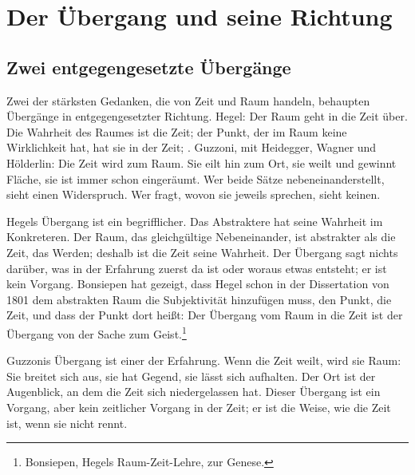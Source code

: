\chapter{Der Übergang und seine Richtung}

\section{Zwei entgegengesetzte Übergänge}

Zwei der stärksten Gedanken, die von Zeit und Raum handeln, behaupten Übergänge in entgegengesetzter Richtung. Hegel: Der Raum geht in die Zeit über. Die Wahrheit des Raumes ist die Zeit; der Punkt, der im Raum keine Wirklichkeit hat, hat sie in der Zeit; . Guzzoni, mit Heidegger, Wagner und Hölderlin: Die Zeit wird zum Raum. Sie eilt hin zum Ort, sie weilt und gewinnt Fläche, sie ist immer schon eingeräumt. Wer beide Sätze nebeneinanderstellt, sieht einen Widerspruch. Wer fragt, wovon sie jeweils sprechen, sieht keinen.

Hegels Übergang ist ein begrifflicher. Das Abstraktere hat seine Wahrheit im Konkreteren. Der Raum, das gleichgültige Nebeneinander, ist abstrakter als die Zeit, das Werden; deshalb ist die Zeit seine Wahrheit. Der Übergang sagt nichts darüber, was in der Erfahrung zuerst da ist oder woraus etwas entsteht; er ist kein Vorgang. Bonsiepen hat gezeigt, dass Hegel schon in der Dissertation von 1801 dem abstrakten Raum die Subjektivität hinzufügen muss, den Punkt, die Zeit, und dass der Punkt dort  heißt: Der Übergang vom Raum in die Zeit ist der Übergang von der Sache zum Geist.\footnote{Bonsiepen, Hegels Raum-Zeit-Lehre, zur Genese.}

Guzzonis Übergang ist einer der Erfahrung. Wenn die Zeit weilt, wird sie Raum: Sie breitet sich aus, sie hat Gegend, sie lässt sich aufhalten. Der Ort ist der Augenblick, an dem die Zeit sich niedergelassen hat. Dieser Übergang ist ein Vorgang, aber kein zeitlicher Vorgang in der Zeit; er ist die Weise, wie die Zeit ist, wenn sie nicht rennt.

